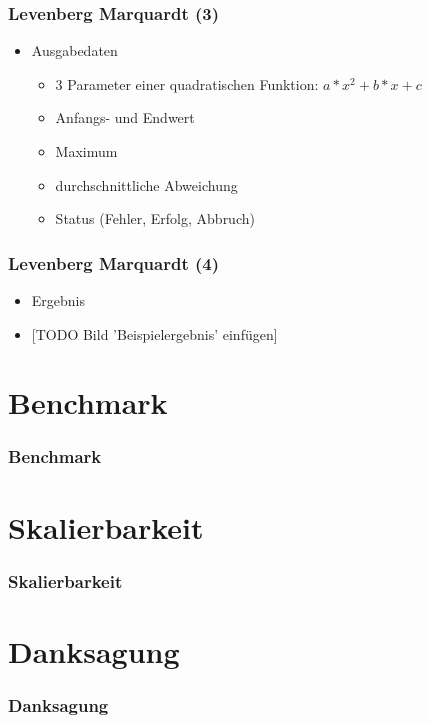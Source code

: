 \documentclass[ddcfooter]{tudbeamer}
\begin{document}
\begin{frame}
    \frametitle*{Levenberg Marquardt (3)}
	\begin{itemize}
        \item{Ausgabedaten}
        	\begin{itemize}
        		\item{3 Parameter einer quadratischen Funktion: $a*x^2+b*x+c$}
        		\item{Anfangs- und Endwert}
        		\item{Maximum}
        		\item{durchschnittliche Abweichung}
        		\item{Status (Fehler, Erfolg, Abbruch)}
        	\end{itemize}
    \end{itemize}
\end{frame}
\begin{frame}
    \frametitle*{Levenberg Marquardt (4)}
	\begin{itemize}
        \item{Ergebnis}
        \item{[TODO Bild 'Beispielergebnis' einfügen]}
    \end{itemize}
\end{frame}
\section{Benchmark}
\begin{frame}
    \frametitle*{Benchmark}
    
\end{frame}
\section{Skalierbarkeit}
\begin{frame}
    \frametitle*{Skalierbarkeit}

\end{frame}
\section{Danksagung}

\begin{frame}
    \frametitle*{Danksagung}
    
\end{frame}
\end{document}
